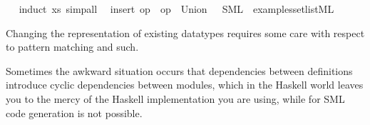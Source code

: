 \begin{isabellebody}
\isadelimproof
\ %
\endisadelimproof
%
\isatagproof
{}\isamarkupfalse%
\ {\isacharparenleft}induct\ xs{\isacharparenright}\ simp{\isacharunderscore}all%
\endisatagproof
{\isafoldproof}%
%
\isadelimproof
%
\endisadelimproof
\isanewline
\isanewline
{}\isamarkupfalse%
\ {\isachardoublequoteopen}{\isacharbraceleft}{\isacharbraceright}{\isachardoublequoteclose}\ insert\ {\isachardoublequoteopen}op\ {\isasymin}{\isachardoublequoteclose}\ {\isachardoublequoteopen}op\ {\isasymunion}{\isachardoublequoteclose}\ {\isachardoublequoteopen}Union{\isachardoublequoteclose}\ \ \ SML\ \ {\isachardoublequoteopen}examples{\isacharslash}set{\isacharunderscore}list{\isachardot}ML{\isachardoublequoteclose}%
\begin{isamarkuptext}%

  \medskip

  Changing the representation of existing datatypes requires
  some care with respect to pattern matching and such.%
\end{isamarkuptext}%
\isamarkuptrue%
%
\isamarkuptrue%
%
\begin{isamarkuptext}%
Sometimes the awkward situation occurs that dependencies
  between definitions introduce cyclic dependencies
  between modules, which in the Haskell world leaves
  you to the mercy of the Haskell implementation you are using,
  while for SML code generation is not possible.


\end{isamarkuptext}
\end{isabellebody}
